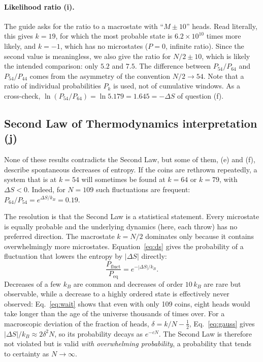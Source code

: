 \documentclass[11pt,a4paper]{article}
\begin{document}
\paragraph{Likelihood ratio (i).} The guide asks for the ratio to a macrostate with ``$M\pm10$''
heads. Read literally, this gives $k=19$, for which the most probable state is
$6.2\times10^{10}$ times more likely, and $k=-1$, which has no microstates ($P=0$, infinite
ratio). Since the second value is meaningless, we also give the ratio for $N/2\pm10$, which is
likely the intended comparison: only $5.2$ and $7.5$. The difference between $P_{54}/P_{64}$ and
$P_{54}/P_{44}$ comes from the asymmetry of the convention $N/2\to54$. Note that a ratio of
individual probabilities $P_k$ is used, not of cumulative windows. As a cross-check,
$\ln(P_{54}/P_{64})=\ln5.179=1.645=-\Delta S$ of question (f).

\subsection{Second Law of Thermodynamics interpretation (j)}
\label{sec:2ndlaw}
None of these results contradicts the Second Law, but some of them, (e) and (f), describe
spontaneous decreases of entropy. If the coins are rethrown repeatedly, a system that is at
$k=54$ will sometimes be found at $k=64$ or $k=79$, with $\Delta S<0$. Indeed, for $N=109$ such
fluctuations are frequent: $P_{64}/P_{54}=e^{\Delta S/k_B}=0.19$.

The resolution is that the Second Law is a statistical statement. Every microstate is equally
probable and the underlying dynamics (here, each throw) has no preferred direction. The
macrostate $k=N/2$ dominates only because it contains overwhelmingly more microstates.
Equation~\eqref{eq:ds} gives the probability of a fluctuation that lowers the entropy by
$|\Delta S|$ directly:
\begin{equation}
  \frac{P_{\text{fluct}}}{P_{\text{eq}}}=e^{-|\Delta S|/k_B}.
  \label{eq:fluct}
\end{equation}
Decreases of a few $k_B$ are common and decreases of order $10\,k_B$ are rare but observable,
while a decrease to a highly ordered state is effectively never observed: Eq.~\eqref{eq:wait}
shows that even with only 109 coins, eight heads would take longer than the age of the universe
thousands of times over. For a macroscopic deviation of the fraction of heads,
$\delta=k/N-\tfrac12$, Eq.~\eqref{eq:gauss} gives $|\Delta S|/k_B\approx2\delta^2N$, so its
probability decays as $e^{-cN}$. The Second Law is therefore not violated but is valid
\emph{with overwhelming probability}, a probability that tends to certainty as $N\to\infty$.
\end{document}
